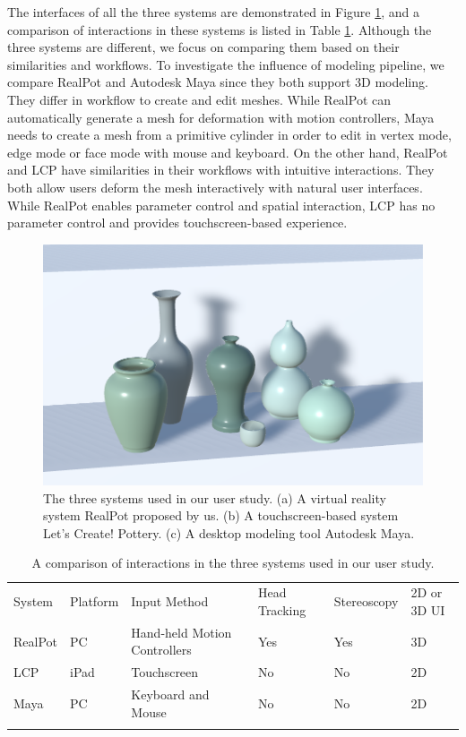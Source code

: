 \documentclass{svjour3}                     %
\begin{document}
The interfaces of all the three systems are demonstrated in Figure \ref{fig:sys}, and a comparison of interactions in these systems is listed in Table \ref{tab:3}. 
Although the three systems are different, we focus on comparing them based on their similarities and workflows.
To investigate the influence of modeling pipeline, we compare RealPot and Autodesk Maya since they both support 3D modeling. They differ in workflow to create and edit meshes. While RealPot can automatically generate a mesh for deformation with motion controllers, Maya needs to create a mesh from a primitive cylinder in order to edit in vertex mode, edge mode or face mode with mouse and keyboard. 
On the other hand, RealPot and LCP have similarities in their workflows with intuitive interactions. They both allow users deform the mesh interactively with natural user interfaces. While RealPot enables parameter control and spatial interaction, LCP has no parameter control and provides touchscreen-based experience.
\begin{figure}
\includegraphics[width=\textwidth]{fig11}
\caption{The three systems used in our user study. (a) A virtual reality system RealPot proposed by us. (b) A touchscreen-based system Let's Create! Pottery. (c) A desktop modeling tool Autodesk Maya.}
\label{fig:sys}
\end{figure}

\begin{table}
\caption{A comparison of interactions in the three systems used in our user study.}
\label{tab:3}       %
\begin{tabular}{llllll}
\hline\noalign{\smallskip}
System & Platform & Input Method & Head Tracking & Stereoscopy & 2D or 3D UI \\
\noalign{\smallskip}\hline\noalign{\smallskip}
RealPot & PC & Hand-held Motion Controllers & Yes & Yes & 3D \\
LCP & iPad & Touchscreen & No & No & 2D \\
Maya & PC & Keyboard and Mouse & No & No & 2D \\
\noalign{\smallskip}\hline
\end{tabular}
\end{table}
\end{document}
